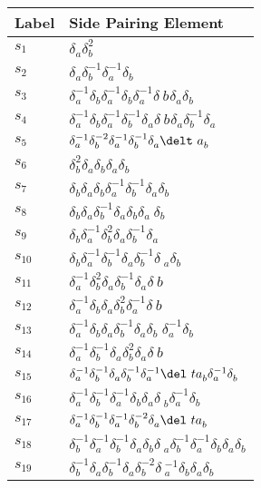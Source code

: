 \documentclass{article}
\begin{document}
\begin{center}
\begin{tabular}{ll}
\toprule
Label & Side Pairing Element\\
\midrule
$s_{1}$ & $\delta_a^{}\delta_b^{2}$ \\
$s_{2}$ & $\delta_a^{}\delta_b^{-1}\delta_a^{-1}\delta_b^{}$ \\
$s_{3}$ & $\delta_a^{-1}\delta_b^{}\delta_a^{-1}\delta_b^{}\delta_a^{-1}\delta_\
b^{}\delta_a^{}\delta_b^{}$ \\
$s_{4}$ & $\delta_a^{-1}\delta_b^{}\delta_a^{-1}\delta_b^{-1}\delta_a^{}\delta_\
b^{}\delta_a^{}\delta_b^{-1}\delta_a^{}$ \\
$s_{5}$ & $\delta_a^{-1}\delta_b^{-2}\delta_a^{-1}\delta_b^{-1}\delta_a^{}\delt\
a_b^{}$ \\
$s_{6}$ & $\delta_b^{2}\delta_a^{}\delta_b^{}\delta_a^{}\delta_b^{}$ \\
$s_{7}$ & $\delta_b^{}\delta_a^{}\delta_b^{}\delta_a^{-1}\delta_b^{-1}\delta_a^\
{}\delta_b^{}$ \\
$s_{8}$ & $\delta_b^{}\delta_a^{}\delta_b^{-1}\delta_a^{}\delta_b^{}\delta_a^{}\
\delta_b^{}$ \\
$s_{9}$ & $\delta_b^{}\delta_a^{-1}\delta_b^{2}\delta_a^{}\delta_b^{-1}\delta_a\
^{}$ \\
$s_{10}$ & $\delta_b^{}\delta_a^{-1}\delta_b^{-1}\delta_a^{}\delta_b^{-1}\delta\
_a^{}\delta_b^{}$ \\
$s_{11}$ & $\delta_a^{-1}\delta_b^{2}\delta_a^{}\delta_b^{-1}\delta_a^{}\delta_\
b^{}$ \\
$s_{12}$ & $\delta_a^{-1}\delta_b^{}\delta_a^{}\delta_b^{2}\delta_a^{-1}\delta_\
b^{}$ \\
$s_{13}$ & $\delta_a^{-1}\delta_b^{}\delta_a^{}\delta_b^{-1}\delta_a^{}\delta_b\
^{}\delta_a^{-1}\delta_b^{}$ \\
$s_{14}$ & $\delta_a^{-1}\delta_b^{-1}\delta_a^{}\delta_b^{2}\delta_a^{}\delta_\
b^{}$ \\
$s_{15}$ & $\delta_a^{-1}\delta_b^{-1}\delta_a^{}\delta_b^{-1}\delta_a^{-1}\del\
ta_b^{}\delta_a^{-1}\delta_b^{}$ \\
$s_{16}$ & $\delta_a^{-1}\delta_b^{-1}\delta_a^{-1}\delta_b^{}\delta_a^{}\delta\
_b^{}\delta_a^{-1}\delta_b^{}$ \\
$s_{17}$ & $\delta_a^{-1}\delta_b^{-1}\delta_a^{-1}\delta_b^{-2}\delta_a^{}\del\
ta_b^{}$ \\
$s_{18}$ & $\delta_b^{-1}\delta_a^{-1}\delta_b^{-1}\delta_a^{}\delta_b^{}\delta\
_a^{}\delta_b^{-1}\delta_a^{-1}\delta_b^{}\delta_a^{}\delta_b^{}$ \\
$s_{19}$ & $\delta_b^{-1}\delta_a^{}\delta_b^{-1}\delta_a^{}\delta_b^{-2}\delta\
_a^{-1}\delta_b^{}\delta_a^{}\delta_b^{}$ \\
\bottomrule
\end{tabular}
\end{center}

\thispagestyle{empty}
\end{document}
